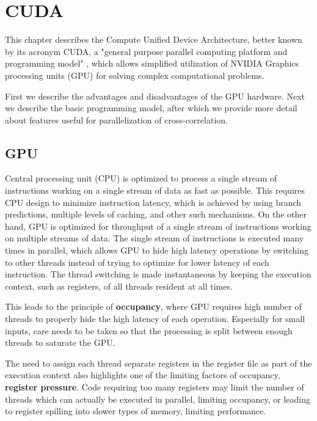 \chapter{CUDA}

This chapter describes the Compute Unified Device Architecture, better known by its acronym CUDA, a "general purpose parallel computing platform and programming model" \citep{site:cuda}, which allows simplified utilization of NVIDIA Graphics processing units (GPU) for solving complex computational problems.

First we describe the advantages and disadvantages of the GPU hardware. Next we describe the basic programming model, after which we provide more detail about features useful for parallelization of cross-correlation.

\section{GPU}
\label{sec:gpu}

Central processing unit (CPU) is optimized to process a single stream of instructions working on a single stream of data as fast as possible. This requires CPU design to minimize instruction latency, which is achieved by using branch predictions, multiple levels of caching, and other such mechanisms. On the other hand, GPU is optimized for throughput of a single stream of instructions working on multiple streams of data. The single stream of instructions is executed many times in parallel, which allows GPU to hide high latency operations by switching to other threads instead of trying to optimize for lower latency of each instruction. The thread switching is made instantaneous by keeping the execution context, such as registers, of all threads resident at all times.

This leads to the principle of \textbf{occupancy}, where GPU requires high number of threads to properly hide the high latency of each operation. Especially for small inputs, care needs to be taken so that the processing is split between enough threads to saturate the GPU.

The need to assign each thread separate registers in the register file as part of the execution context also highlights one of the limiting factors of occupancy, \textbf{register pressure}. Code requiring too many registers may limit the number of threads which can actually be executed in parallel, limiting occupancy, or leading to register spilling into slower types of memory, limiting performance.


